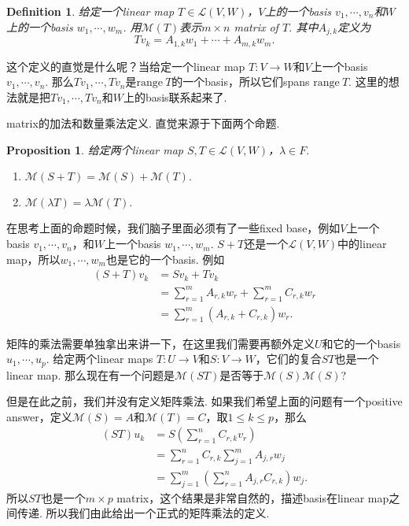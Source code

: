 \documentclass{article}
\newtheorem{proposition}[theorem]{Proposition}
\newtheorem{definition}[theorem]{Definition}
\newcommand*{\xfunc}[4]{{#2}\colon{#3}{#1}{#4}}
\newcommand*{\func}[3]{\xfunc{\to}{#1}{#2}{#3}}
\newcommand\range[1]{\text{range}\ #1}
\begin{document}
\begin{definition}
\rm 给定一个linear map $T \in \mathcal{L}(V,W)$，$V$上的一个basis $v_1,\cdots,v_n$和$W$上的一个basis $w_1,\cdots,w_m$. 用$\mathcal{M}(T)$表示$m \times n$ matrix of $T$. 其中$A_{j,k}$定义为
$$
Tv_k = A_{1,k}w_1 +  \cdots + A_{m,k}w_m.
$$
\end{definition}

这个定义的直觉是什么呢？当给定一个linear map $\func{T}{V}{W}$和$V$上一个basis $v_1,\cdots,v_n$. 那么$Tv_1,\cdots,Tv_n$是$\range{T}$的一个basis，所以它们spans $\range{T}$. 这里的想法就是把$Tv_1,\cdots,Tv_n$和$W$上的basis联系起来了.

{\color{red} matrix的加法和数量乘法定义}. 直觉来源于下面两个命题.

\begin{proposition}
\rm 给定两个linear map $S,T \in \mathcal{L}(V,W)$，$\lambda \in F.$
\begin{enumerate}
	\item $\mathcal{M}(S+T) = \mathcal{M}(S) + \mathcal{M}(T).$
	\item $\mathcal{M}(\lambda T) = \lambda \mathcal{M}(T).$
\end{enumerate}
\end{proposition}

在思考上面的命题时候，我们脑子里面必须有了一些fixed base，例如$V$上一个basis $v_1,\cdots,v_n$，和$W$上一个basis $w_1,\cdots,w_m$. $S+T$还是一个$\mathcal{L}(V,W)$中的linear map，所以$w_1,\cdots,w_m$也是它的一个basis. 例如
$$
\begin{aligned}
	(S+T)v_k &= Sv_k + Tv_k \\
			 &= \sum\limits_{r=1}^{m}A_{r,k}w_r + \sum\limits_{r=1}^{m}C_{r,k}w_r \\
			 &= \sum\limits_{r=1}^{m}(A_{r,k} + C_{r,k})w_r.  
\end{aligned}	
$$


矩阵的乘法需要单独拿出来讲一下，在这里我们需要再额外定义$U$和它的一个basis $u_1,\cdots,u_p$. 给定两个linear maps $\func{T}{U}{V}$和$\func{S}{V}{W}$，它们的复合$ST$也是一个linear map. {\color{red} 那么现在有一个问题是$\mathcal{M}(ST)$是否等于$\mathcal{M}(S)\mathcal{M}(S)$}?

但是在此之前，我们并没有定义矩阵乘法. 如果我们希望上面的问题有一个positive answer，定义$\mathcal{M}(S) = A$和$\mathcal{M}(T) = C$，取$1 \leq k \leq p $，那么
$$
\begin{aligned}
(ST)u_k &= S(\sum\limits_{r=1}^{n}C_{r,k}v_r) \\
		&= \sum\limits_{r=1}^{n}C_{r,k}\sum\limits_{j=1}^{m}A_{j,r}w_j\\
		&= \sum\limits_{j=1}^{m}(\sum\limits_{r=1}^{n}A_{j,r}C_{r,k})w_j.
\end{aligned}
$$
所以$ST$也是一个$m \times p$ matrix，这个结果是非常自然的，描述basis在linear map之间传递. 所以我们由此给出一个正式的矩阵乘法的定义.
\end{document}
